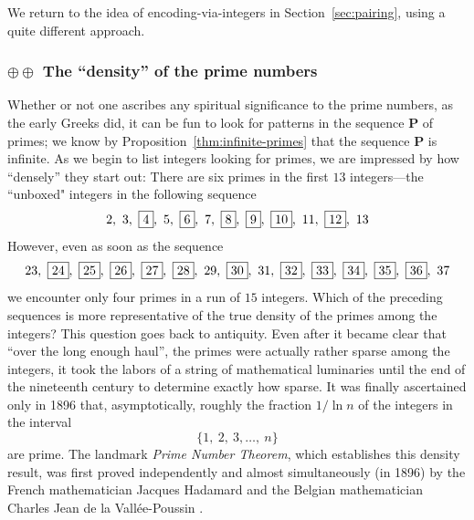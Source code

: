 \smallskip

We return to the idea of encoding-via-integers in Section~\ref{sec:pairing}, using a quite different approach.

\subsubsection{$\oplus \oplus$ The ``density'' of the prime numbers}
\label{sec:prime-density}


Whether or not one ascribes any spiritual significance to the prime numbers, as the early Greeks did, it can be fun to look for patterns in the sequence {\bf P} of primes; we know by Proposition~\ref{thm:infinite-primes} that the sequence {\bf P} is infinite.  As we begin to list integers looking for primes, we are impressed by how ``densely'' they start out:  There are six primes in the first $13$ integers---the ``unboxed" integers in the following sequence
\[  2, \ 3, \ \fbox{4}, \ 5, \ \fbox{6}, \ 7, \ \fbox{8}, \ \fbox{9}, \ \fbox{10}, \ 11, \ \fbox{12}, \ 13  \] 
However, even as soon as the sequence
\[ 23, \ \fbox{24}, \ \fbox{25}, \ \fbox{26}, \ \fbox{27}, \ \fbox{28}, \ 29, \ \fbox{30}, \ 31, 
\ \fbox{32}, \ \fbox{33}, \ \fbox{34}, \ \fbox{35}, \ \fbox{36}, \ 37
\]
we encounter only four primes in a run of $15$ integers.  Which of the preceding sequences is more representative of the true density of the primes among the integers?  This question goes back to antiquity.  Even after it became clear that ``over the long enough haul'', the primes were actually rather sparse among the integers, it took the labors of a string of mathematical luminaries until the  end of the nineteenth century to determine exactly how sparse.  It was finally ascertained only in 1896 that, asymptotically, roughly the fraction $1/ \ln n$ of the integers in the interval
\[ \{ 1, \ 2, \ 3, \ldots, \ n \} \]
are prime.  The landmark {\it Prime Number Theorem}, which establishes this density result, was first proved independently and almost simultaneously (in 1896) by the French mathematician Jacques Hadamard  \cite{Hadamard} and the Belgian mathematician Charles Jean de la 
Vall\'{e}e-Poussin \cite{Poussin}.
 


